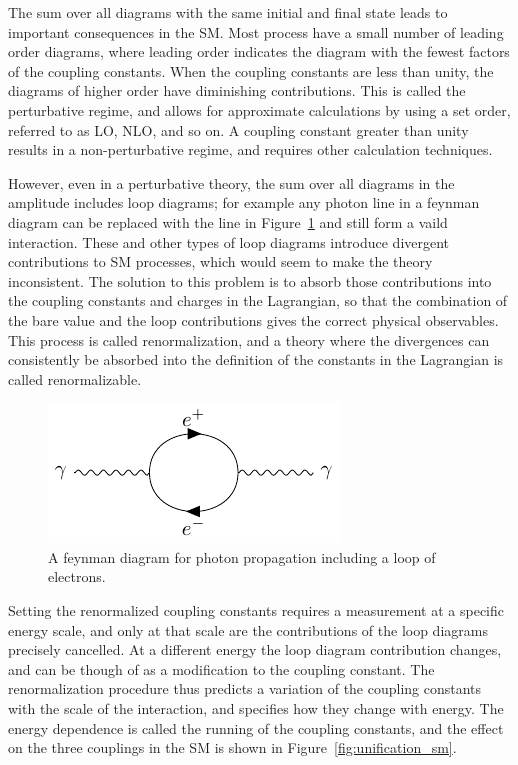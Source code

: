 The sum over all diagrams with the same initial and final state leads to important consequences in the \ac{SM}.
Most process have a small number of leading order diagrams, where leading order indicates the diagram with the fewest factors of the coupling constants.
When the coupling constants are less than unity, the diagrams of higher order have diminishing contributions.
This is called the perturbative regime, and allows for approximate calculations by using a set order, referred to as \ac{LO}, \ac{NLO}, and so on.
A coupling constant greater than unity results in a non-perturbative regime, and requires other calculation techniques.

However, even in a perturbative theory, the sum over all diagrams in the amplitude includes loop diagrams; for example any photon line in a feynman diagram can be replaced with the line in Figure~\ref{fig:loop_diagram} and still form a vaild interaction.
These and other types of loop diagrams introduce divergent contributions to \ac{SM} processes, which would seem to make the theory inconsistent.
The solution to this problem is to absorb those contributions into the coupling constants and charges in the Lagrangian, so that the combination of the bare value and the loop contributions gives the correct physical observables.
This process is called renormalization, and a theory where the divergences can consistently be absorbed into the definition of the constants in the Lagrangian is called renormalizable.

\begin{figure}
\centering
\includegraphics[width=\halffig]{figures/loop.pdf}
\caption{A feynman diagram for photon propagation including a loop of electrons.}
\label{fig:loop_diagram}
\end{figure}

Setting the renormalized coupling constants requires a measurement at a specific energy scale, and only at that scale are the contributions of the loop diagrams precisely cancelled.
At a different energy the loop diagram contribution changes, and can be though of as a modification to the coupling constant.
The renormalization procedure thus predicts a variation of the coupling constants with the scale of the interaction, and specifies how they change with energy.
The energy dependence is called the running of the coupling constants, and the effect on the three couplings in the \ac{SM} is shown in Figure~\ref{fig:unification_sm}.

